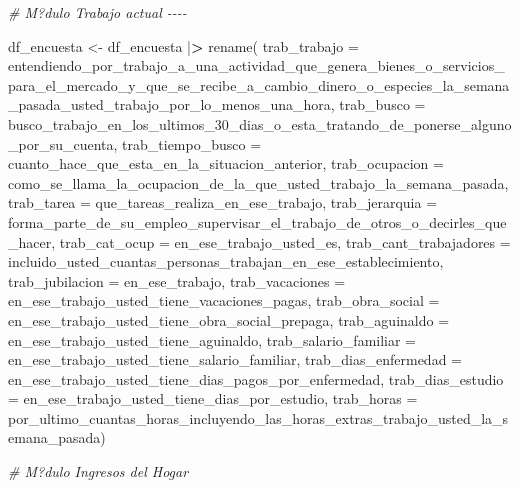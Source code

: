 \documentclass[
]{book}
\newenvironment{Shaded}{\begin{snugshade}}{\end{snugshade}}
\newcommand{\AttributeTok}[1]{\textcolor[rgb]{0.77,0.63,0.00}{#1}}
\newcommand{\CommentTok}[1]{\textcolor[rgb]{0.56,0.35,0.01}{\textit{#1}}}
\newcommand{\ErrorTok}[1]{\textcolor[rgb]{0.64,0.00,0.00}{\textbf{#1}}}
\newcommand{\FunctionTok}[1]{\textcolor[rgb]{0.00,0.00,0.00}{#1}}
\newcommand{\NormalTok}[1]{#1}
\newcommand{\OtherTok}[1]{\textcolor[rgb]{0.56,0.35,0.01}{#1}}
\newcommand{\SpecialCharTok}[1]{\textcolor[rgb]{0.00,0.00,0.00}{#1}}
\theoremstyle{definition}
\theoremstyle{definition}
\theoremstyle{definition}
\theoremstyle{definition}
\theoremstyle{remark}
\begin{document}
\begin{Shaded}
\begin{Highlighting}[]
\CommentTok{\# M?dulo Trabajo actual {-}{-}{-}{-}}

\NormalTok{df\_encuesta }\OtherTok{\textless{}{-}}\NormalTok{ df\_encuesta }\SpecialCharTok{|}\ErrorTok{\textgreater{}}
\FunctionTok{rename}\NormalTok{(}
\AttributeTok{trab\_trabajo =}\NormalTok{ entendiendo\_por\_trabajo\_a\_una\_actividad\_que\_genera\_bienes\_o\_servicios\_para\_el\_mercado\_y\_que\_se\_recibe\_a\_cambio\_dinero\_o\_especies\_la\_semana\_pasada\_usted\_trabajo\_por\_lo\_menos\_una\_hora,}
\AttributeTok{trab\_busco =}\NormalTok{ busco\_trabajo\_en\_los\_ultimos\_30\_dias\_o\_esta\_tratando\_de\_ponerse\_alguno\_por\_su\_cuenta,}
\AttributeTok{trab\_tiempo\_busco =}\NormalTok{ cuanto\_hace\_que\_esta\_en\_la\_situacion\_anterior,}
\AttributeTok{trab\_ocupacion =}\NormalTok{ como\_se\_llama\_la\_ocupacion\_de\_la\_que\_usted\_trabajo\_la\_semana\_pasada,}
\AttributeTok{trab\_tarea =}\NormalTok{ que\_tareas\_realiza\_en\_ese\_trabajo,}
\AttributeTok{trab\_jerarquia =}\NormalTok{ forma\_parte\_de\_su\_empleo\_supervisar\_el\_trabajo\_de\_otros\_o\_decirles\_que\_hacer,}
\AttributeTok{trab\_cat\_ocup =}\NormalTok{ en\_ese\_trabajo\_usted\_es,}
\AttributeTok{trab\_cant\_trabajadores =}\NormalTok{ incluido\_usted\_cuantas\_personas\_trabajan\_en\_ese\_establecimiento,}
\AttributeTok{trab\_jubilacion =}\NormalTok{ en\_ese\_trabajo,}
\AttributeTok{trab\_vacaciones =}\NormalTok{ en\_ese\_trabajo\_usted\_tiene\_vacaciones\_pagas,}
\AttributeTok{trab\_obra\_social =}\NormalTok{ en\_ese\_trabajo\_usted\_tiene\_obra\_social\_prepaga,}
\AttributeTok{trab\_aguinaldo =}\NormalTok{ en\_ese\_trabajo\_usted\_tiene\_aguinaldo,}
\AttributeTok{trab\_salario\_familiar =}\NormalTok{ en\_ese\_trabajo\_usted\_tiene\_salario\_familiar,}
\AttributeTok{trab\_dias\_enfermedad =}\NormalTok{ en\_ese\_trabajo\_usted\_tiene\_dias\_pagos\_por\_enfermedad,}
\AttributeTok{trab\_dias\_estudio =}\NormalTok{ en\_ese\_trabajo\_usted\_tiene\_dias\_por\_estudio,}
\AttributeTok{trab\_horas =}\NormalTok{ por\_ultimo\_cuantas\_horas\_incluyendo\_las\_horas\_extras\_trabajo\_usted\_la\_semana\_pasada)}

\CommentTok{\# M?dulo Ingresos del Hogar}


\end{Highlighting}
\end{Shaded}
\end{document}
